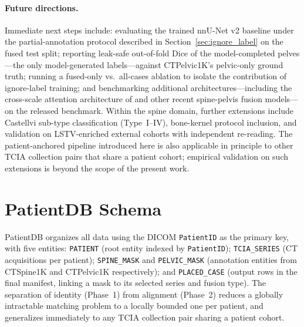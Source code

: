 \documentclass[pmlr]{jmlr}
\begin{document}
\paragraph{Future directions.}
Immediate next steps include: evaluating the trained nnU-Net v2
baseline under the partial-annotation protocol described in
Section~\ref{sec:ignore_label} on the fused test split; reporting
leak-safe out-of-fold Dice of the model-completed pelves---the only
model-generated labels---against CTPelvic1K's pelvic-only ground
truth; running a fused-only vs.\ all-cases ablation to isolate the
contribution of ignore-label training; and benchmarking additional
architectures---including the cross-scale attention architecture of
\citet{Li2025LumbarMechanism} and other recent spine-pelvis fusion
models---on the released benchmark.
Within the spine domain, further extensions include Castellvi
sub-type classification (Type~I--IV), bone-kernel protocol
inclusion, and validation on LSTV-enriched external cohorts with
independent re-reading.
The patient-anchored pipeline introduced here is also applicable
in principle to other TCIA collection pairs that share a patient
cohort; empirical validation on such extensions is beyond the scope
of the present work.




\newpage
\appendix

\section{PatientDB Schema}
\label{app:patientdb}

PatientDB organizes all data using the DICOM \texttt{PatientID} as the
primary key, with five entities:
\texttt{PATIENT} (root entity indexed by \texttt{PatientID});
\texttt{TCIA\_SERIES} (CT acquisitions per patient);
\texttt{SPINE\_MASK} and \texttt{PELVIC\_MASK} (annotation entities
from CTSpine1K and CTPelvic1K respectively); and
\texttt{PLACED\_CASE} (output rows in the final manifest,
linking a mask to its selected series and fusion type).
The separation of identity (Phase~1) from alignment (Phase~2)
reduces a globally intractable matching problem to a locally
bounded one per patient, and generalizes immediately to any TCIA
collection pair sharing a patient cohort.
\end{document}
